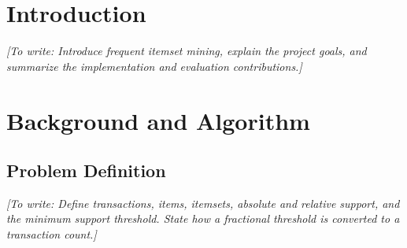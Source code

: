\documentclass[12pt,letterpaper]{article}
\newcommand{\reporttitle}{FP-Growth for Frequent Itemset Mining}
\newcommand{\reportauthor}{Your Name}
\newcommand{\reportcourse}{Course Number and Name}
\newcommand{\reportinstructor}{Instructor Name}
\newcommand{\reportdate}{October 30, 2026}
\newcommand{\placeholder}[1]{\par\noindent\textit{[To write: #1]}\par}
\begin{document}
\hypersetup{pageanchor=false}



\hypersetup{pageanchor=true}
\begin{abstract}
\placeholder{Summarize the problem, implementation, datasets, validation
approach, and main measured findings in about 150--250 words. Write this last.}
\end{abstract}
\tableofcontents
\clearpage
{}

\section{Introduction}
\label{sec:introduction}
\placeholder{Introduce frequent itemset mining, explain the project goals,
and summarize the implementation and evaluation contributions.}

\section{Background and Algorithm}
\label{sec:algorithm}
\subsection{Problem Definition}
\placeholder{Define transactions, items, itemsets, absolute and relative
support, and the minimum support threshold. State how a fractional threshold
is converted to a transaction count.}
\end{document}
